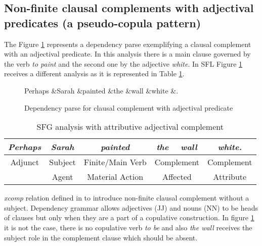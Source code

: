\subsection{Non-finite clausal complements with adjectival predicates (a pseudo-copula pattern)}
\label{sec:nonfinite-clausal-complement}
The Figure \ref{fig:clausal-complement-jj} represents a dependency parse exemplifying a clausal complement with an adjectival predicate. In this analysis there is a main clause governed by the verb \textit{to paint} and the second one by the adjective \textit{white}. 
In SFL Figure \ref{fig:clausal-complement-jj} receives a different analysis as it is represented in Table \ref{tab:adjectival-complement}.

\begin{figure}[!ht]
	\centering
	\begin{dependency}
		\begin{deptext}[]
			Perhaps \&Sarah \&painted \&the \&wall \&white \&. \\
		\end{deptext}
	\end{dependency}
	\caption{Dependency parse for clausal complement with adjectival predicate}
	\label{fig:clausal-complement-jj}
\end{figure} 

\begin{table}[!ht]
	\centering
	\begin{tabular}{|c|c|c|c|c|c|}
		\hline
		\textit{Perhaps} & \textit{Sarah} & \textit{painted} & \textit{the}   & \textit{wall}  & \textit{white.} \\ \hline
		Adjunct          & Subject        & Finite/Main Verb & \multicolumn{2}{c|}{Complement} & Complement      \\ \hline
		& Agent          & Material Action  & \multicolumn{2}{c|}{Affected}   & Attribute       \\ \hline
	\end{tabular}
	\caption{SFG analysis with attributive adjectival complement}
	\label{tab:adjectival-complement}
\end{table}

\textit{xcomp} relation defined in \citep{Marneffe2008} to introduce non-finite clausal complement without a subject. Dependency grammar allows adjectives (JJ) and nouns (NN) to be heads of clauses but only when they are a part of a copulative construction. In figure \ref{fig:clausal-complement-jj} it is not the case, there is no copulative verb \textit{to be} and also \textit{the wall} receives the subject role in the complement clause which should be absent. 

